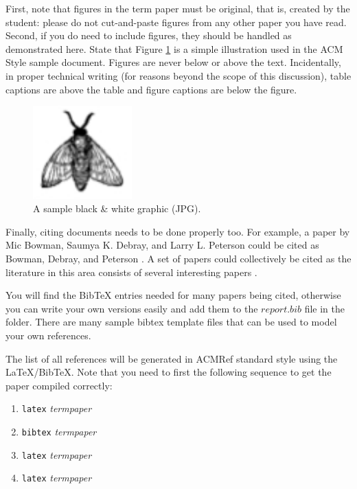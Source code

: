 \documentclass{sig-alternate}
\begin{document}
First, note that figures in the term paper must be original,
that is, created by the student: please do not cut-and-paste
figures from any other paper you have read. Second, if you
do need to include figures, they should be handled as
demonstrated here. State that Figure \ref{sample graphic} is
a simple illustration used in the ACM Style sample
document. Figures are never below or above the
text. Incidentally, in proper technical writing (for reasons
beyond the scope of this discussion), table captions are
above the table and figure captions are below the figure.

\begin{figure}[htb]
\label{sample graphic}
\begin{center}
\includegraphics[width=1.5in]{fly.jpg}
\caption{A sample black \& white graphic (JPG).}
\end{center}
\end{figure}

Finally, citing documents needs to be done properly too. For
example, a paper by Mic Bowman, Saumya K. Debray, and Larry
L. Peterson could be cited as Bowman, Debray, and Peterson
\cite{bowman:reasoning}. A set of papers could collectively
be cited as the literature in this area consists of several
interesting papers
\cite{braams:babel,clark:pct,herlihy:methodology}.

You will find the BibTeX entries needed for many papers being cited,
otherwise you can write your own versions easily and add them to the
$report.bib$ file in the folder. There are many sample bibtex
template files that can be used to model your own references.

The list of all references will be generated in ACMRef
standard style using the \LaTeX{}/BibTeX. Note that you
need to first the following sequence to get the paper
compiled correctly:

\begin{enumerate}
\item {\tt latex} {\em termpaper}
\item {\tt bibtex} {\em termpaper}
\item {\tt latex} {\em termpaper}
\item {\tt latex} {\em termpaper}
\end{enumerate}



\balance
\end{document}
